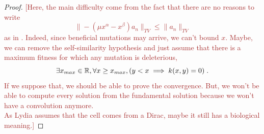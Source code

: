 \documentclass[11pt]{amsart}
\newcommand{\ndr}[1]{\textcolor{brown}{[#1]}}
\begin{document}
\begin{proof}
\ndr{Here, the main difficulty come from the fact that there are no reasons to write 
$$ \| -(\mu x^\alpha - x^\beta) a_n\|_{TV} \leq \| a_n \|_{TV}$$
as in \cite[p.16]{doumic2021inverse}. Indeed, since beneficial mutations may arrive, we can't bound $x$. Maybe, we can remove the self-similarity hypothesis and just assume that there is a maximum fitness for which any mutation is deleterious, \ie 
$$ \exists x_{max} \in \mathbb{R}, \forall x \geq x_{max}, (y < x \implies k(x,y) = 0) \; .$$
If we suppose that, we should be able to prove the convergence. But, we won't be able to compute every solution from the fundamental solution because we won't have a convolution anymore. \\
As Lydia assumes that the cell comes from a Dirac, maybe it still has a biological meaning.}
\end{proof}





\end{document}
